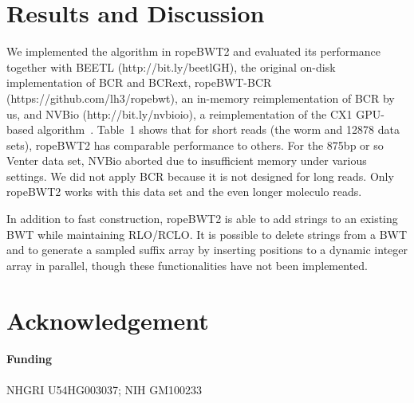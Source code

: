 \documentclass{bioinfo}
\begin{document}
\vspace*{-1em}
\section{Results and Discussion}
We implemented the algorithm in ropeBWT2 and evaluated its performance
together with BEETL (http://bit.ly/beetlGH), the original on-disk
implementation of BCR and BCRext, ropeBWT-BCR (https://github.com/lh3/ropebwt),
an in-memory reimplementation of BCR by us, and NVBio (http://bit.ly/nvbioio), a
reimplementation of the CX1 GPU-based algorithm~\citep{DBLP:journals/corr/LiuLL14}.
Table~1 shows that for short reads (the worm and 12878 data sets), ropeBWT2 has comparable performance to
others. For the 875bp or so Venter data set, NVBio aborted due to insufficient
memory under various settings. We did not apply BCR because it is not designed
for long reads. Only ropeBWT2 works with this data set and the even longer
moleculo reads.

In addition to fast construction, ropeBWT2 is able to add strings
to an existing BWT while maintaining RLO/RCLO. It is possible to delete
strings from a BWT and to generate a sampled suffix array by inserting
positions to a dynamic integer array in parallel, though these functionalities
have not been implemented.

\vspace*{-1em}
\section*{Acknowledgement}
\paragraph{Funding\textcolon} NHGRI U54HG003037; NIH GM100233


\end{document}
